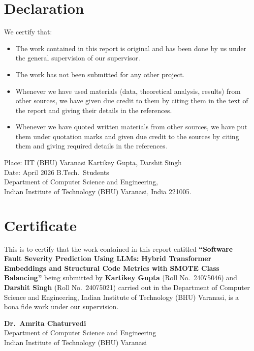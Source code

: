 \documentclass[12pt, a4paper]{report}
\begin{document}
\clearpage
\chapter*{Declaration}
\thispagestyle{plain}
We certify that:
\begin{itemize}[leftmargin=1.5cm]
  \item The work contained in this report is original and has been done by us under the general supervision of our supervisor.
  \item The work has not been submitted for any other project.
  \item Whenever we have used materials (data, theoretical analysis, results) from other sources, we have given due credit to them by citing them in the text of the report and giving their details in the references.
  \item Whenever we have quoted written materials from other sources, we have put them under quotation marks and given due credit to the sources by citing them and giving required details in the references.
\end{itemize}
\vspace{1.5cm}
\noindent
Place: IIT (BHU) Varanasi \hfill Kartikey Gupta, Darshit Singh\\
Date: April 2026 \hfill B.Tech.\ Students\\
\hfill Department of Computer Science and Engineering,\\
\hfill Indian Institute of Technology (BHU) Varanasi, India 221005.

\clearpage
\chapter*{Certificate}
\thispagestyle{plain}
This is to certify that the work contained in this report entitled \textbf{``Software Fault Severity Prediction Using LLMs: Hybrid Transformer Embeddings and Structural Code Metrics with SMOTE Class Balancing''} being submitted by \textbf{Kartikey Gupta} (Roll No.\ 24075046) and \textbf{Darshit Singh} (Roll No.\ 24075021) carried out in the Department of Computer Science and Engineering, Indian Institute of Technology (BHU) Varanasi, is a bona fide work under our supervision.

\vspace{2cm}
\noindent
\textbf{Dr.\ Amrita Chaturvedi}\\
Department of Computer Science and Engineering\\
Indian Institute of Technology (BHU) Varanasi
\end{document}
